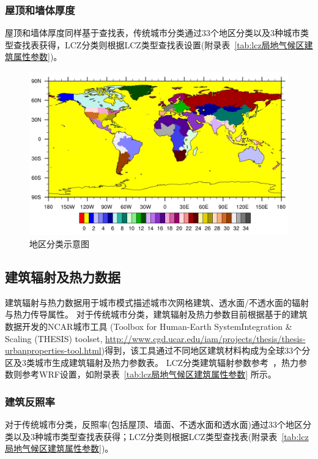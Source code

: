 \subsubsection{屋顶和墙体厚度}\label{屋顶和墙体厚度}
屋顶和墙体厚度同样基于查找表，传统城市分类通过33个地区分类以及3种城市类型查找表获得，LCZ分类则根据LCZ类型查找表设置(附录表~\ref{tab:lcz局地气候区建筑属性参数})。

{
  \begin{figure}[htbp]
    \centering
    \includegraphics[width=.7\paperwidth]{Figures/基础数据/地区分类.jpg}
    \caption{地区分类示意图}
    \label{fig:地区分类}
  \end{figure}
}

\subsection{建筑辐射及热力数据}\label{建筑辐射及热力数据}
建筑辐射与热力数据用于城市模式描述城市次网格建筑、透水面/不透水面的辐射与热力传导属性。
对于传统城市分类，建筑辐射及热力参数目前根据\citet{oleson2020parameterization}基于\citet{jackson2010parameterization}的建筑数据开发的NCAR城市工具
(Toolbox for Human-Earth SystemIntegration \& Scaling (THESIS) toolset, \url{http://www.cgd.ucar.edu/iam/projects/thesis/thesis-urbanproperties-tool.html})得到，该工具通过不同地区建筑材料构成为全球33个分区及3类城市生成建筑辐射及热力参数表。
LCZ分类建筑辐射参数参考~\citet{stewart2014evaluation}，热力参数则参考WRF设置，如附录表~\ref{tab:lcz局地气候区建筑属性参数} 所示。

\subsubsection{建筑反照率}\label{建筑反照率}
对于传统城市分类，反照率(包括屋顶、墙面、不透水面和透水面)通过33个地区分类以及3种城市类型查找表获得；LCZ分类则根据LCZ类型查找表(附录表~\ref{tab:lcz局地气候区建筑属性参数})。

